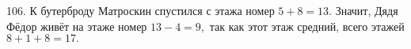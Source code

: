 106. К бутерброду Матроскин спустился с этажа номер $5+8=13.$ Значит, Дядя Фёдор живёт на этаже номер $13-4=9,$ так как этот этаж средний, всего этажей $8+1+8=17.$\\
